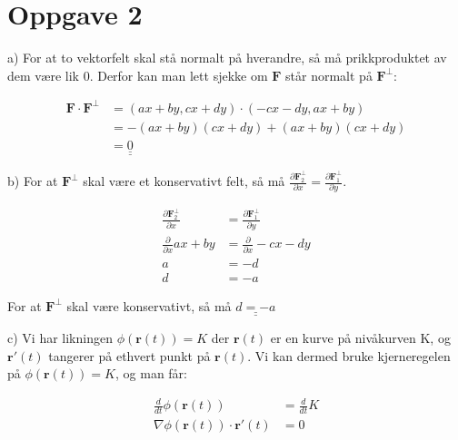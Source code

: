 \documentclass[12pt, a4paper]{article}
\begin{document}
\newpage

\section*{Oppgave 2}

a) For at to vektorfelt skal stå normalt på hverandre, så må prikkproduktet av dem være lik 0. 
Derfor kan man lett sjekke om $\textbf{F}$ står normalt på $\textbf{F}^\perp$:

\begin{equation}
    \begin{split}
        \textbf{F} \cdot \textbf{F}^\perp &= (ax + by, cx + dy) \cdot (-cx -dy, ax + by) \\
                                          &= -(ax + by)(cx + dy) + (ax + by)(cx + dy) \\
                                          &= \underline{\underline{0}}
    \end{split}
\end{equation}

b) For at $\textbf{F}^\perp$ skal være et konservativt felt, så må $\frac{\partial \textbf{F}^\perp_2}{\partial x} = \frac{\partial \textbf{F}^\perp_1}{\partial y}$.

\begin{equation}
    \begin{split}
        \frac{\partial \textbf{F}^\perp_2}{\partial x} &= \frac{\partial \textbf{F}^\perp_1}{\partial y} \\
                    \frac{\partial}{\partial x} ax +by &= \frac{\partial}{\partial x} -cx -dy \\
                                                     a &= -d \\
                                                     d &= -a
    \end{split}
\end{equation}

For at $\textbf{F}^\perp$ skal være konservativt, så må $\underline{\underline{d = -a}}$

c) Vi har likningen $\phi(\textbf{r}(t)) = K$ der $\textbf{r}(t)$ er en kurve på nivåkurven K, og $\textbf{r}'(t)$ tangerer på ethvert punkt på
$\textbf{r}(t)$. Vi kan dermed bruke kjerneregelen på $\phi(\textbf{r}(t)) = K$, og man får:

\begin{equation}
    \begin{split}
        \frac{d}{dt}\phi(\textbf{r}(t)) &= \frac{d}{dt} K \\
        \nabla\phi(\textbf{r}(t)) \cdot \textbf{r}'(t) &= 0
    \end{split}
\end{equation}
\end{document}
